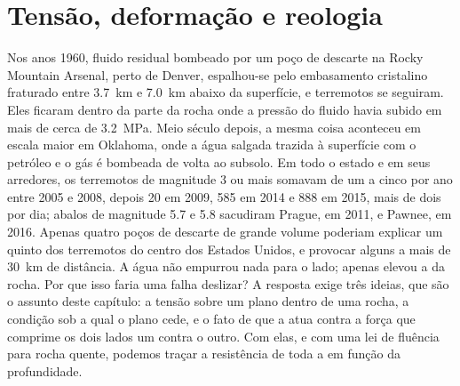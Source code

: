 \chapter{Tensão, deformação e reologia}\label{ch:b1:stress-strain-rheology}

Nos anos 1960, fluido residual bombeado por um poço de descarte na Rocky Mountain Arsenal, perto de Denver, espalhou-se pelo embasamento cristalino fraturado entre \qty{3.7}{km} e \qty{7.0}{km} abaixo da superfície, e terremotos se seguiram. Eles ficaram dentro da parte da rocha onde a pressão do fluido havia subido em mais de cerca de \qty{3.2}{MPa}.
Meio século depois, a mesma coisa aconteceu em escala maior em Oklahoma, onde a água salgada trazida à superfície com o petróleo e o gás é bombeada de volta ao subsolo. Em todo o estado e em seus arredores, os terremotos de magnitude 3 ou mais somavam de um a cinco por ano entre 2005 e 2008, depois \num{20} em 2009, \num{585} em 2014 e \num{888} em 2015, mais de dois por dia; abalos de magnitude 5.7 e 5.8 sacudiram Prague, em 2011, e Pawnee, em 2016. Apenas quatro poços de descarte de grande volume poderiam explicar um quinto dos terremotos do centro dos Estados Unidos, e provocar alguns a mais de \qty{30}{km} de distância.
A água não empurrou nada para o lado; apenas elevou a  da rocha. Por que isso faria uma falha deslizar? A resposta exige três ideias, que são o assunto deste capítulo: a tensão sobre um plano dentro de uma rocha, a condição sob a qual o plano cede, e o fato de que a  atua contra a força que comprime os dois lados um contra o outro. Com elas, e com uma lei de fluência para rocha quente, podemos traçar a resistência de toda a  em função da profundidade.

